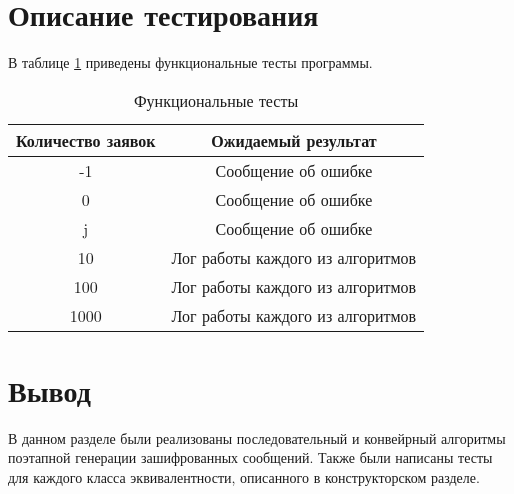 %
%
%    
%
%    

\section{Описание тестирования}

В таблице \ref{tab:tests} приведены функциональные тесты программы.

\begin{table}[h!]
	\begin{center}
    \begin{threeparttable}
        \captionsetup{justification=raggedright,singlelinecheck=off}
        \caption{\label{tab:tests}Функциональные тесты}
        \begin{tabular}{|c|c|}
			\hline
            \textbf{Количество заявок} & \textbf{Ожидаемый результат} \\ [2mm]
            \hline
            -1
            &
            Сообщение об ошибке
            \\
            \hline
            0
            &
            Сообщение об ошибке
            \\
            \hline
            j
            &
            Сообщение об ошибке
            \\
            \hline
            10
            &
            Лог работы каждого из алгоритмов
            \\
            \hline
            100
            &
            Лог работы каждого из алгоритмов
            \\
            \hline
            1000
            &
            Лог работы каждого из алгоритмов
            \\
            \hline
		\end{tabular}
    \end{threeparttable} 
	\end{center}
\end{table}

\section{Вывод}

В данном разделе были реализованы последовательный и конвейрный алгоритмы
поэтапной генерации зашифрованных сообщений. Также были написаны
тесты для каждого класса эквивалентности, описанного в конструкторском разделе.
